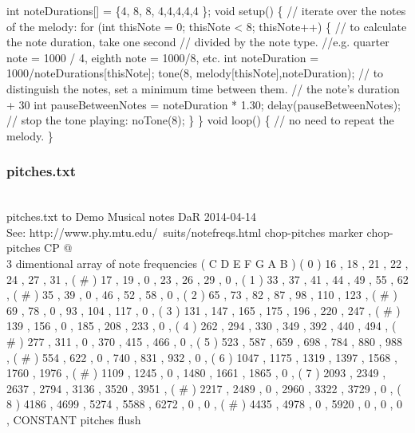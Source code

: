 \documentclass[10pt,english]{article}
\begin{document}
int noteDurations[] = \{4, 8, 8, 4,4,4,4,4 \};
void setup() \{
  // iterate over the notes of the melody:
  for (int thisNote = 0; thisNote < 8; thisNote++) \{
    // to calculate the note duration, take one second
    // divided by the note type.
    //e.g. quarter note = 1000 / 4, eighth note = 1000/8, etc.
    int noteDuration = 1000/noteDurations[thisNote];
    tone(8, melody[thisNote],noteDuration);
    // to distinguish the notes, set a minimum time between them.
    // the note's duration + 30%
    int pauseBetweenNotes = noteDuration * 1.30;
    delay(pauseBetweenNotes);
    // stop the tone playing:
    noTone(8);
  \}
\}
void loop() \{
  // no need to repeat the melody.
\}
\nwendcode{}\nwdocspar


\subsubsection{pitches.txt}

\nwenddocs{}\endmoddef
\\ pitches.txt to Demo Musical notes      DaR 2014-04-14
\\ See: http://www.phy.mtu.edu/~suits/notefreqs.html
chop-pitches
marker chop-pitches
CP @ \\ 3 dimentional array of note frequencies
(        C      D      E      F      G      A      B )
( 0 )   16 ,   18 ,   21 ,   22 ,   24 ,   27 ,   31 ,
( # )   17 ,   19 ,    0 ,   23 ,   26 ,   29 ,    0 ,
( 1 )   33 ,   37 ,   41 ,   44 ,   49 ,   55 ,   62 ,
( # )   35 ,   39 ,    0 ,   46 ,   52 ,   58 ,    0 ,
( 2 )   65 ,   73 ,   82 ,   87 ,   98 ,  110 ,  123 ,
( # )   69 ,   78 ,    0 ,   93 ,  104 ,  117 ,    0 ,
( 3 )  131 ,  147 ,  165 ,  175 ,  196 ,  220 ,  247 ,
( # )  139 ,  156 ,    0 ,  185 ,  208 ,  233 ,    0 ,
( 4 )  262 ,  294 ,  330 ,  349 ,  392 ,  440 ,  494 ,
( # )  277 ,  311 ,    0 ,  370 ,  415 ,  466 ,    0 ,
( 5 )  523 ,  587 ,  659 ,  698 ,  784 ,  880 ,  988 ,
( # )  554 ,  622 ,    0 ,  740 ,  831 ,  932 ,    0 ,
( 6 ) 1047 , 1175 , 1319 , 1397 , 1568 , 1760 , 1976 ,
( # ) 1109 , 1245 ,    0 , 1480 , 1661 , 1865 ,    0 ,
( 7 ) 2093 , 2349 , 2637 , 2794 , 3136 , 3520 , 3951 ,
( # ) 2217 , 2489 ,    0 , 2960 , 3322 , 3729 ,    0 ,
( 8 ) 4186 , 4699 , 5274 , 5588 , 6272 ,    0 ,    0 ,
( # ) 4435 , 4978 ,    0 , 5920 ,    0 ,    0 ,    0 ,
CONSTANT pitches
flush
\nwendcode{}\nwdocspar
\end{document}
